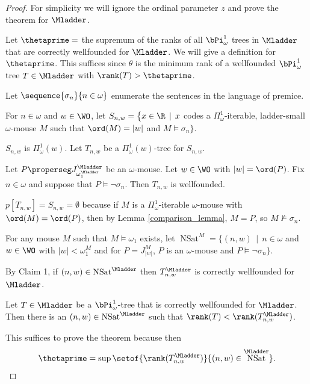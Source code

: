 \documentclass[oneside,12pt]{amsart}
\DeclareMathOperator{\NSat}{NSat}
\begin{document}
\begin{proof}
For simplicity we will ignore the ordinal parameter $z$ and prove the theorem for $\Mladder$.

Let $\thetaprime=$ the supremum of the ranks of all
$\bPi^1_{\omega}$ trees in $\Mladder$ that are correctly wellfounded for $\Mladder$. We
will give a definition for $\thetaprime$. This suffices since $\theta$ is the
minimum rank of a wellfounded $\bPi^1_{\omega}$ tree $T\in \Mladder$ with $\rank(T)>\thetaprime$.


Let $\sequence{\sigma_n}{n\in\omega}$ enumerate the sentences in the language of premice.

For $n\in\omega$ and $w\in\WO$, let
$S_{n,w}=\big\{x\in \R \,\mid\, x$  codes a $\Pi^1_{\omega}$-iterable,
ladder-small $\omega$-mouse $M$ such that $\ord(M)=|w|$ and  $M\models\sigma_n\big\}$.

$S_{n,w}$ is $\Pi^1_{\omega}(w)$. Let $T_{n,w}$ be a $\Pi^1_{\omega}(w)$-tree
for $S_{n,w}$.

\begin{claim}[Claim 1]
Let $P\properseg J^{\Mladder}_{\omega_1^{\Mladder}}$ be an $\omega$-mouse. Let $w\in\WO$ with
$|w|=\ord(P)$. Fix $n\in\omega$
and suppose that $P\models \neg \sigma_n$. Then $T_{n,w}$ is wellfounded.
\end{claim}
\begin{subproof}
$p[T_{n,w}]=S_{n,w} = \emptyset$ because if $M$ is a $\Pi^1_{\omega}$-iterable $\omega$-mouse with
$\ord(M) = \ord(P)$, then by Lemma \ref{comparison_lemma}, $M=P$, so $M\not\models\sigma_n$.
\end{subproof}

For any mouse $M$ such that $M\models \omega_1$ exists,
let $\NSat^M=\big\{ (n,w) \, \mid \, n\in\omega$ and $w\in\WO$ with $|w|<\omega_1^{M}$ and
for $P=J^M_{|w|}$, $P$ is an $\omega$-mouse and $P\models \neg \sigma_n \big\}$.

By Claim 1, if $(n,w)\in \NSat^{\Mladder}$ then $T^{\Mladder}_{n,w}$ is correctly wellfounded for
$\Mladder$.


\begin{claim}[Claim 2]
Let $T\in\Mladder$ be a $\bPi^1_{\omega}$-tree that is correctly wellfounded for $\Mladder$.
Then there is an $(n,w)\in \NSat^{\Mladder}$ such that $\rank(T) < \rank(T^{\Mladder}_{n,w})$.
\end{claim}

This suffices to prove the theorem because then
$$\thetaprime=\sup\setof{\rank(T^{\Mladder}_{n,w})}{(n,w)\in \NSat^{\Mladder}}.$$


\end{proof}
\end{document}
